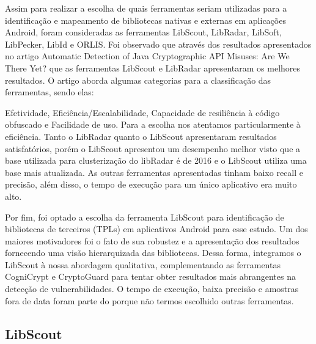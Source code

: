 

Assim para realizar a escolha de quais ferramentas seriam utilizadas para a identificação e mapeamento de bibliotecas nativas e externas em aplicações Android, foram consideradas as ferramentas LibScout, LibRadar, LibSoft, LibPecker, LibId e ORLIS. Foi observado que através dos resultados apresentados no artigo Automatic Detection of Java Cryptographic API Misuses: Are We There Yet? que as ferramentas LibScout e LibRadar apresentaram os melhores resultados. O artigo aborda algumas categorias para a classificação das ferramentas, sendo elas:

Efetividade, Eficiência/Escalabilidade, Capacidade de resiliência à código obfuscado e Facilidade de uso. Para a escolha nos atentamos particularmente à eficiência. Tanto o LibRadar quanto o LibScout apresentaram resultados satisfatórios, porém o LibScout apresentou um desempenho melhor visto que a base utilizada para clusterização do libRadar é de 2016 e o LibScout utiliza uma base mais atualizada. As outras ferramentas apresentadas tinham baixo recall e precisão, além disso, o tempo de execução para um único aplicativo era muito alto.

Por fim, foi optado a escolha da ferramenta LibScout para identificação de bibliotecas de terceiros (TPLs) em aplicativos Android para esse estudo. Um dos maiores motivadores foi o fato de sua robustez e a apresentação dos resultados fornecendo uma visão hierarquizada das bibliotecas. Dessa forma, integramos o LibScout à nossa abordagem qualitativa, complementando as ferramentas CogniCrypt e CryptoGuard para tentar obter resultados mais abrangentes na detecção de vulnerabilidades. O tempo de execução, baixa precisão e amostras fora de data foram parte do porque não termos escolhido outras ferramentas.

\subsection{LibScout} %

